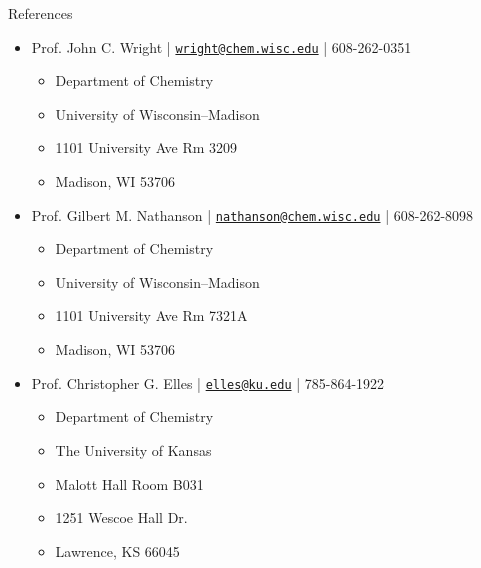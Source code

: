 \documentclass{resume} %
\begin{document}
\begin{rSection}{References}
	\begin{itemize}[leftmargin = 0 pt]
		\item Prof. John C. Wright | \href{mailto:wright@chem.wisc.edu}{\texttt{wright@chem.wisc.edu}} | 608-262-0351
		\begin{itemize}
			\item[] Department of Chemistry
			\item[] University of Wisconsin--Madison
			\item[] 1101 University Ave Rm 3209
			\item[] Madison, WI 53706
		\end{itemize}	
		\item Prof. Gilbert M. Nathanson | \href{mailto:nathanson@chem.wisc.edu}{\texttt{nathanson@chem.wisc.edu}} | 608-262-8098
		\begin{itemize}
			\item[] Department of Chemistry
			\item[] University of Wisconsin--Madison
			\item[] 1101 University Ave Rm 7321A
			\item[] Madison, WI 53706
		\end{itemize}
		\item Prof. Christopher G. Elles | \href{mailto:elles@ku.edu}{\texttt{elles@ku.edu}} | 785-864-1922
		\begin{itemize}
			\item[] Department of Chemistry
			\item[] The University of Kansas
			\item[] Malott Hall Room B031
			\item[] 1251 Wescoe Hall Dr.
			\item[] Lawrence, KS 66045 
		\end{itemize}		
	\end{itemize}
\end{rSection}
\end{document}
